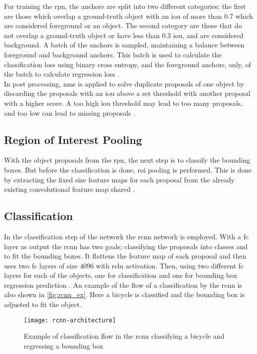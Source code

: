 For training the \gls{rpn}, the anchors are split into two different categories; the first are those which overlap a ground-truth object with an \gls{iou} of more than $0.7$ which are considered foreground or an object. The second category are those that do not overlap a ground-truth object or have less than $0.3$ \gls{iou}, and are considered background. 
A batch of the anchors is sampled, maintaining a balance between foreground and background anchors. This batch is used to calculate the classification loss using binary cross entropy, and the foreground anchors, only, of the batch to calculate regression loss \citep{Ren2017}.\\

In post processing, \gls{nms} is applied to solve duplicate proposals of one object by discarding the proposals with an \gls{iou} above a set threshold with another proposal with a higher score. A too high \gls{iou} threshold may lead to too many proposals, and too low can lead to missing proposals \citep{Ren2017}.

\subsection{Region of Interest Pooling}
With the object proposals from the \gls{rpn}, the next step is to classify the bounding boxes. But before the classification is done, \gls{roi} pooling is performed. This is done by extracting the fixed size feature maps for each proposal from the already existing convolutional feature map shared \citep{Ren2017}.

\subsection{Classification}
In the classification step of the network the \gls{rcnn} network is employed. With a \gls{fc} layer as output the \gls{rcnn} has two goals; classifying the proposals into classes and to fit the bounding boxes. It flattens the feature map of each proposal and then uses two \gls{fc} layers of size $4096$ with \gls{relu} activation. Then, using two different \gls{fc} layers for each of the objects, one for classification and one for bounding box regression prediction \citep{Ren2017}. An example of the flow of a classification by the \gls{rcnn} is also shown in \autoref{fig:rcnn_ex}. Here a bicycle is classified and the bounding box is adjusted to fit the object.

\begin{figure}[H]
	\centering
	\texttt{[image: rcnn-architecture]}
	\caption{Example of classification flow in the \gls{rcnn} classifying a bicycle and regressing a bounding box \citep{Rey2018}}
	\label{fig:rcnn_ex}
\end{figure}
